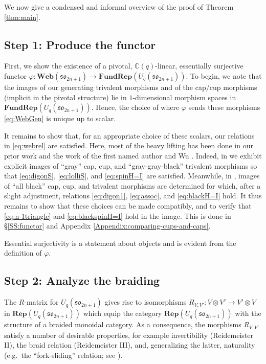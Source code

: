 \documentclass[10pt]{amsart}
\numberwithin{equation}{section}
\theoremstyle{definition}
\renewcommand{\to}{\rightarrow}
\def\C{{\mathbb C}}
\newcommand{\son}[1][2n+1]{\mathfrak{so}_{#1}}
\newcommand{\Rep}{\mathbf{Rep}}
\newcommand{\FRep}{\mathbf{FundRep}}
\newcommand{\Web}{\mathbf{Web}}
\newcommand{\ot}{\otimes}
\begin{document}
We now give a condensed and informal overview of the proof of Theorem \ref{thm:main}. 

\subsection{Step 1: Produce the functor}
First, we show the existence of a pivotal, 
$\C(q)$-linear, essentially surjective functor $\varphi \colon \Web(\son) \to \FRep(U_q(\son))$.
To begin, we note that the images of our generating trivalent morphisms and of the cap/cup morphisms 
(implicit in the pivotal structure) lie in $1$-dimensional morphism spaces in $\FRep(U_q(\son))$. 
Hence, the choice of where $\varphi$ sends these morphisms \eqref{eq:WebGen} is unique up to scalar. 

It remains to show that, for an appropriate choice of these scalars, 
our relations in \eqref{eq:webrel} are satisfied.
Here, most of the heavy lifting has been done in our prior work \cite{BER} and the work of 
the first named author and Wu \cite{BodWu}. 
Indeed, in \cite[Section 4]{BER} we exhibit explicit images of ``gray'' cap, cup, and ``gray-gray-black'' trivalent morphisms 
so that %
\eqref{eq:digonS}, 
\eqref{eq:lolliS}, 
and \eqref{eq:spinH=I} are satisfied.
Meanwhile, in \cite{BodWu}, images of ``all black'' cap, cup, and trivalent morphisms are determined 
for which, after a slight adjustment, relations 
\eqref{eq:digon1}, 
\eqref{eq:assoc}, 
and \eqref{eq:blackH=I} hold.
It thus remains to show that these choices can be made compatibly, 
and to verify that 
\eqref{eq:n-1triangle} and \eqref{eq:blackspinH=I} hold 
in the image. 
This is done in \S \ref{SS:functor} and Appendix \ref{Appendix:comparing-cups-and-caps}.

Essential surjectivity is a statement about objects and is evident from the definition of $\varphi$. 

\subsection{Step 2: Analyze the braiding}\label{ss:O2}

The $R$-matrix for $U_q(\son)$ gives rise to isomorphisms $R_{V,V'} \colon V \ot V' \to V' \ot V$ in $\Rep(U_q(\son))$ 
which equip the category $\Rep(U_q(\son))$ with the structure of a braided monoidal category. 
As a consequence, the morphisms $R_{V,V'}$ satisfy a number of desirable properties, 
for example invertibility (Reidemeister II), the braid relation (Reidemeister III), and, generalizing the latter,
naturality (e.g.~the ``fork-sliding'' relation; see \cite[Relation 11]{RT1}).
\end{document}
